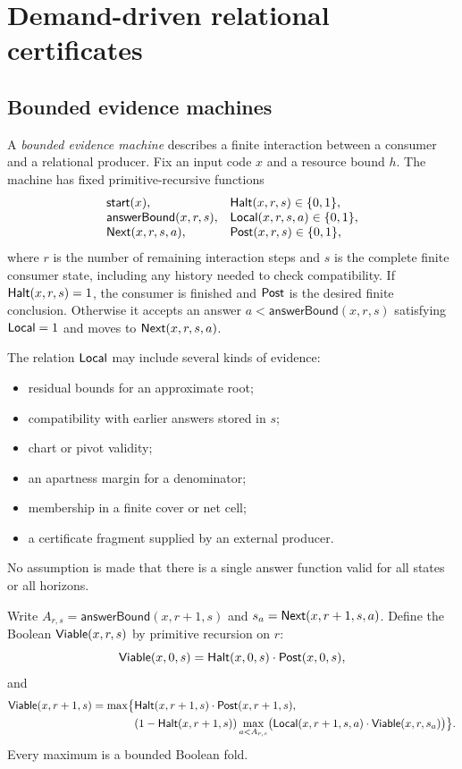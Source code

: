 \section{Demand-driven relational certificates}
\label{sec:relational}

\subsection{Bounded evidence machines}

A \emph{bounded evidence machine} describes a finite interaction between a consumer and a relational producer.  Fix an input code $x$ and a resource bound $h$.  The machine has fixed primitive-recursive functions
\[
\begin{array}{ll}
  \mathsf{start}(x), & \mathsf{Halt}(x,r,s)\in\{0,1\},\\
  \mathsf{answerBound}(x,r,s), & \mathsf{Local}(x,r,s,a)\in\{0,1\},\\
  \mathsf{Next}(x,r,s,a), & \mathsf{Post}(x,r,s)\in\{0,1\},
\end{array}
\]
where $r$ is the number of remaining interaction steps and $s$ is the complete finite consumer state, including any history needed to check compatibility.  If $\mathsf{Halt}(x,r,s)=1$, the consumer is finished and $\mathsf{Post}$ is the desired finite conclusion.  Otherwise it accepts an answer $a<\mathsf{answerBound}(x,r,s)$ satisfying $\mathsf{Local}=1$ and moves to $\mathsf{Next}(x,r,s,a)$.

The relation $\mathsf{Local}$ may include several kinds of evidence:
\begin{itemize}
\item residual bounds for an approximate root;
\item compatibility with earlier answers stored in $s$;
\item chart or pivot validity;
\item an apartness margin for a denominator;
\item membership in a finite cover or net cell;
\item a certificate fragment supplied by an external producer.
\end{itemize}
No assumption is made that there is a single answer function valid for all states or all horizons.

\begin{definition}
\label{def:viability}
Write $A_{r,s}=\mathsf{answerBound}(x,r+1,s)$ and
$s_a=\mathsf{Next}(x,r+1,s,a)$.  Define the Boolean $\mathsf{Viable}(x,r,s)$ by primitive recursion on $r$:
\[
\mathsf{Viable}(x,0,s)=\mathsf{Halt}(x,0,s)\cdot\mathsf{Post}(x,0,s),
\]
and
\[
\begin{aligned}
\mathsf{Viable}(x,r+1,s)=\max\bigl\{&\mathsf{Halt}(x,r+1,s)\cdot\mathsf{Post}(x,r+1,s),\\
 &(1-\mathsf{Halt}(x,r+1,s))
   \max_{a<A_{r,s}}
   \bigl(\mathsf{Local}(x,r+1,s,a)\cdot\mathsf{Viable}(x,r,s_a)\bigr)\bigr\}.
\end{aligned}
\]
Every maximum is a bounded Boolean fold.
\end{definition}

